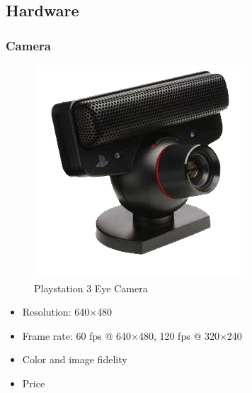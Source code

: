 \documentclass{beamer}
\begin{document}
	\subsection*{Hardware}
	\begin{frame}
		\frametitle{Camera}
		\begin{figure}
			\includegraphics[scale=0.3]{images/ps3eye} 
			\caption{Playstation 3 Eye Camera}
		\end{figure}
		\vspace*{-0.5cm}
		\begin{itemize}
			\item Resolution: 640$\times$480
			\item Frame rate: 60 fps $@$ 640$\times$480, 120 fps $@$ 320$\times$240
			\item Color and image fidelity
			\item Price
		\end{itemize}
	\end{frame}
\end{document}
